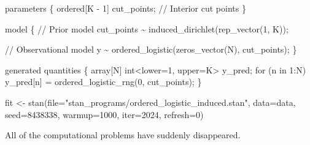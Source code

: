 \documentclass[
  letterpaper,
  DIV=11,
  numbers=noendperiod]{scrartcl}
\newenvironment{Shaded}{\begin{snugshade}}{\end{snugshade}}
\newcommand{\AttributeTok}[1]{\textcolor[rgb]{0.40,0.45,0.13}{#1}}
\newcommand{\CommentTok}[1]{\textcolor[rgb]{0.37,0.37,0.37}{#1}}
\newcommand{\ControlFlowTok}[1]{\textcolor[rgb]{0.00,0.23,0.31}{#1}}
\newcommand{\DataTypeTok}[1]{\textcolor[rgb]{0.68,0.00,0.00}{#1}}
\newcommand{\DecValTok}[1]{\textcolor[rgb]{0.68,0.00,0.00}{#1}}
\newcommand{\FunctionTok}[1]{\textcolor[rgb]{0.28,0.35,0.67}{#1}}
\newcommand{\KeywordTok}[1]{\textcolor[rgb]{0.00,0.23,0.31}{#1}}
\newcommand{\NormalTok}[1]{\textcolor[rgb]{0.00,0.23,0.31}{#1}}
\newcommand{\OtherTok}[1]{\textcolor[rgb]{0.00,0.23,0.31}{#1}}
\newcommand{\SpecialCharTok}[1]{\textcolor[rgb]{0.37,0.37,0.37}{#1}}
\newcommand{\StringTok}[1]{\textcolor[rgb]{0.13,0.47,0.30}{#1}}
\begin{document}
\begin{codelisting}
\begin{Shaded}
\begin{Highlighting}[]
\KeywordTok{parameters}\NormalTok{ \{}
  \DataTypeTok{ordered}\NormalTok{[K {-} }\DecValTok{1}\NormalTok{] cut\_points; }\CommentTok{// Interior cut points}
\NormalTok{\}}

\KeywordTok{model}\NormalTok{ \{}
  \CommentTok{// Prior model}
\NormalTok{  cut\_points \textasciitilde{} induced\_dirichlet(rep\_vector(}\DecValTok{1}\NormalTok{, K));}

  \CommentTok{// Observational model}
\NormalTok{  y \textasciitilde{} ordered\_logistic(zeros\_vector(N), cut\_points);}
\NormalTok{\}}

\KeywordTok{generated quantities}\NormalTok{ \{}
  \DataTypeTok{array}\NormalTok{[N] }\DataTypeTok{int}\NormalTok{\textless{}}\KeywordTok{lower}\NormalTok{=}\DecValTok{1}\NormalTok{, }\KeywordTok{upper}\NormalTok{=K\textgreater{} y\_pred;}
  \ControlFlowTok{for}\NormalTok{ (n }\ControlFlowTok{in} \DecValTok{1}\NormalTok{:N)}
\NormalTok{    y\_pred[n] = ordered\_logistic\_rng(}\DecValTok{0}\NormalTok{, cut\_points);}
\NormalTok{\}}
\end{Highlighting}
\end{Shaded}

\end{codelisting}

\begin{Shaded}
\begin{Highlighting}[]
\NormalTok{fit }\OtherTok{\textless{}{-}} \FunctionTok{stan}\NormalTok{(}\AttributeTok{file=}\StringTok{"stan\_programs/ordered\_logistic\_induced.stan"}\NormalTok{,}
            \AttributeTok{data=}\NormalTok{data, }\AttributeTok{seed=}\DecValTok{8438338}\NormalTok{,}
            \AttributeTok{warmup=}\DecValTok{1000}\NormalTok{, }\AttributeTok{iter=}\DecValTok{2024}\NormalTok{, }\AttributeTok{refresh=}\DecValTok{0}\NormalTok{)}
\end{Highlighting}
\end{Shaded}

All of the computational problems have suddenly disappeared.

\begin{Shaded}
\end{Shaded}
\end{document}
